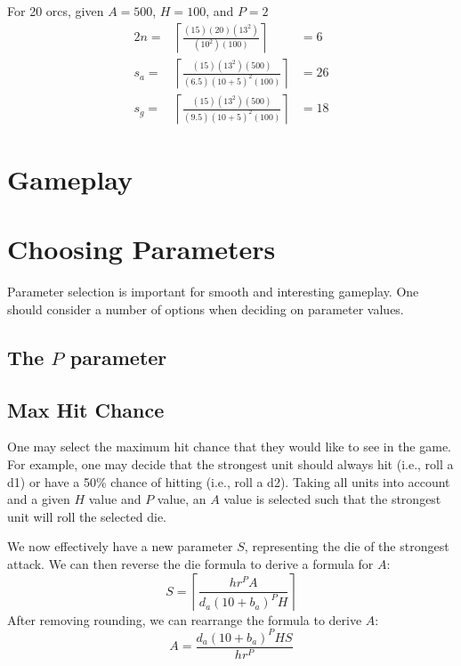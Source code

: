 \documentclass{article}
\begin{document}
For 20 orcs, given $A = 500$, $H = 100$, and $P = 2$
\begin{alignat*}{2}
    n   =&  
        \left\lceil
            \frac
                {(15) (20) (13^2)}
                {(10^2) (100)}
        \right\rceil
            &=  6
    \\
    s_a =&
        \left\lceil
            \frac
                {(15) (13^2) (500)}
                {(6.5) (10 + 5)^2 (100)}
        \right\rceil
            &=   26 \\
    s_g =&  
        \left\lceil
            \frac
                {(15) (13^2) (500)}
                {(9.5) (10 + 5)^2 (100)}
        \right\rceil
            &=  18
\end{alignat*}


\section{Gameplay}\label{sec:game}

\section{Choosing Parameters}\label{sec:params}

Parameter selection is important for smooth and interesting gameplay.
One should consider a number of options when deciding on parameter values.

\subsection{The $P$ parameter}


\subsection{Max Hit Chance}

One may select the maximum hit chance that they would like to see in the game.
For example, one may decide that the strongest unit should always hit (i.e., roll a d1)
or have a 50\% chance of hitting (i.e., roll a d2).
Taking all units into account and a given $H$ value and $P$ value,
an $A$ value is selected such that the strongest unit will roll the selected die.

We now effectively have a new parameter $S$, representing the die of the strongest attack.
We can then reverse the die formula to derive a formula for $A$:
\[
    S =
        \left\lceil
            \frac
                {h r^P A}
                {d_a (10 + b_{a})^P H}
        \right\rceil
\]
After removing rounding, we can rearrange the formula to derive $A$:
\[
    A = 
        \frac
            {d_a (10 + b_{a})^P H S}
            {h r^P}
\]
\end{document}
